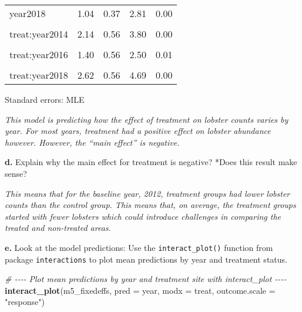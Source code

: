 \documentclass[
]{article}
\newenvironment{Shaded}{\begin{snugshade}}{\end{snugshade}}
\newcommand{\AttributeTok}[1]{\textcolor[rgb]{0.13,0.29,0.53}{#1}}
\newcommand{\CommentTok}[1]{\textcolor[rgb]{0.56,0.35,0.01}{\textit{#1}}}
\newcommand{\FunctionTok}[1]{\textcolor[rgb]{0.13,0.29,0.53}{\textbf{#1}}}
\newcommand{\NormalTok}[1]{#1}
\newcommand{\StringTok}[1]{\textcolor[rgb]{0.31,0.60,0.02}{#1}}
\begin{document}
\begin{table}[!h]
\begin{threeparttable}
\begin{tabular}{lrrrr}
year2018 & 1.04 & 0.37 & 2.81 & 0.00\\
\cellcolor{gray!10}{treat:year2013} & \cellcolor{gray!10}{1.52} & \cellcolor{gray!10}{0.57} & \cellcolor{gray!10}{2.66} & \cellcolor{gray!10}{0.01}\\
treat:year2014 & 2.14 & 0.56 & 3.80 & 0.00\\
\addlinespace
\cellcolor{gray!10}{treat:year2015} & \cellcolor{gray!10}{2.12} & \cellcolor{gray!10}{0.56} & \cellcolor{gray!10}{3.79} & \cellcolor{gray!10}{0.00}\\
treat:year2016 & 1.40 & 0.56 & 2.50 & 0.01\\
\cellcolor{gray!10}{treat:year2017} & \cellcolor{gray!10}{1.55} & \cellcolor{gray!10}{0.56} & \cellcolor{gray!10}{2.77} & \cellcolor{gray!10}{0.01}\\
treat:year2018 & 2.62 & 0.56 & 4.69 & 0.00\\
\bottomrule
\end{tabular}
\begin{tablenotes}
\item Standard errors: MLE
\end{tablenotes}
\end{threeparttable}
\end{table}

\emph{This model is predicting how the effect of treatment on lobster
counts varies by year. For most years, treatment had a positive effect
on lobster abundance however. However, the ``main effect'' is negative.}

\textbf{d.} Explain why the main effect for treatment is negative? *Does
this result make sense?

\emph{This means that for the baseline year, 2012, treatment groups had
lower lobster counts than the control group. This means that, on
average, the treatment groups started with fewer lobsters which could
introduce challenges in comparing the treated and non-treated areas.}

\textbf{e.} Look at the model predictions: Use the
\texttt{interact\_plot()} function from package \texttt{interactions} to
plot mean predictions by year and treatment status.

\begin{Shaded}
\begin{Highlighting}[]
\CommentTok{\# {-}{-}{-}{-} Plot mean predictions by year and treatment site with interact\_plot {-}{-}{-}{-}}
\FunctionTok{interact\_plot}\NormalTok{(m5\_fixedeffs,}
              \AttributeTok{pred =}\NormalTok{ year,}
              \AttributeTok{modx =}\NormalTok{ treat,}
              \AttributeTok{outcome.scale =} \StringTok{"response"}\NormalTok{)}
\end{Highlighting}
\end{Shaded}
\end{document}
